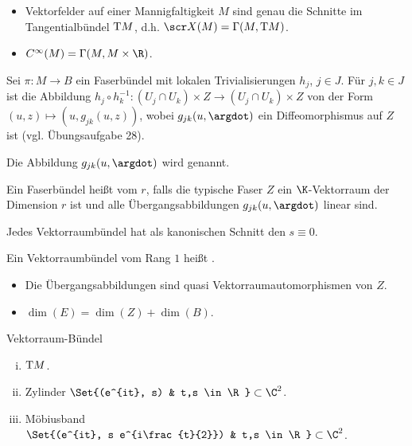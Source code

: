 \begin{ex*}
    \begin{itemize}
        \item
            Vektorfelder auf einer Mannigfaltigkeit $M$ sind genau die Schnitte im Tangentialbündel $\mathrm{T} M$, d.h. $\scr X(M) = \Gamma(M, \T M)$.
        \item
            $C^\infty(M) = \Gamma(M, M \times \R)$.
    \end{itemize}
\end{ex*}

\begin{nt} \label{5.5}
    Sei $\pi: M \to B$ ein Faserbündel mit lokalen Trivialisierungen $h_j$, $j \in J$.
    Für $j, k \in J$ ist die Abbildung
    \begin{math}
        h_j \circ h_k^{-1}: (U_j \cap U_k) \times Z \to (U_j \cap U_k) \times Z
    \end{math}
    von der Form $(u, z) \mapsto (u, g_{jk}(u,z))$, wobei $g_{jk}(u,\argdot)$ ein Diffeomorphismus auf $Z$ ist (vgl. Übungsaufgabe 28).

    Die Abbildung $g_{jk}(u, \argdot)$ wird  genannt.
\end{nt}

\begin{df} \label{5.6}
    Ein Faserbündel heißt  vom  $r$, falls die typische Faser $Z$ ein $\K$-Vektorraum der Dimension $r$ ist und alle Übergangsabbildungen $g_{jk}(u, \argdot)$ linear sind.

    Jedes Vektorraumbündel hat als kanonischen Schnitt den  $s \equiv 0$.

    Ein Vektorraumbündel vom Rang $1$ heißt .
    \begin{note}
        \begin{itemize}
            \item
                Die Übergangsabbildungen sind quasi Vektorraumautomorphismen von $Z$.
            \item
                $\dim(E) = \dim(Z) + \dim(B)$.
        \end{itemize}
    \end{note}
\end{df}

\begin{ex*}
    Vektorraum-Bündel
    \begin{enumerate}[(i)]
        \item
            $\mathrm{T} M$.
        \item
            Zylinder $\Set{(e^{it}, s) & t,s \in \R} \subset \C^2$.
        \item
            Möbiusband $\Set{(e^{it}, s e^{i\frac{t}{2}}) & t,s \in \R} \subset \C^2$.
    \end{enumerate}
\end{ex*}

